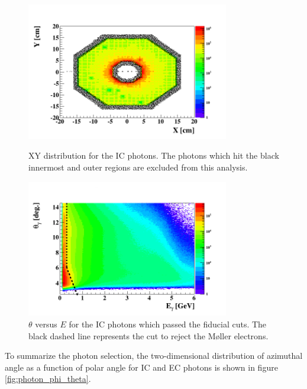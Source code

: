 \begin{figure}[tbp]
\begin{minipage}[c]{.46\linewidth}
\hspace{-0.4in}
\includegraphics[height=6.0cm]{fig_analysis/photons_IC_XY_2.png}
\caption{XY distribution for the IC photons. The photons which hit the black innermost and outer regions are excluded from this analysis.} 
\label{fig:photons_IC_XY_2}
\end{minipage} \hfill
\begin{minipage}[c]{.46\linewidth}
\hspace{-0.4in}
\includegraphics[height=6.0cm]{fig_analysis/photons_IC_theta_En_1.png}
\caption{$\theta$ versus $E$ for the IC photons which passed the fiducial cuts. The black dashed line represents the cut to reject the M\o ller electrons.}
\label{fig:photons_IC_theta_En_1}
\end{minipage}
\end{figure}
To summarize the photon selection, the two-dimensional distribution of azimuthal angle as a function of polar angle for IC and EC photons is shown in figure \ref{fig:photon_phi_theta}. 
